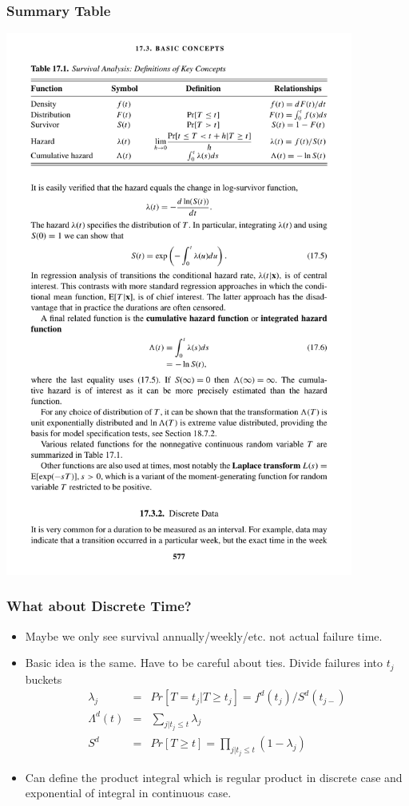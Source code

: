 \documentclass[aspectratio=169]{beamer}
\begin{document}
\begin{frame}
\frametitle{Summary Table}
\begin{center}
\includegraphics[width=4.5in]{./resources/parametrictable1.pdf}
\end{center}
\end{frame}

\begin{frame}
\frametitle{What about Discrete Time?}
\begin{itemize}
\item Maybe we only see survival annually/weekly/etc. not actual failure time.
\item Basic idea is the same. Have to be careful about ties. Divide failures into $t_j$ buckets
\begin{eqnarray*}
\lambda_j &=& Pr[T = t_j | T \geq t_j] = f^d(t_j) / S^d(t_{j-})\\
\Lambda^d(t)&=&\sum_{j | t_j \leq t} \lambda_j \\
S^d &=& Pr [T \geq t ] = \prod_{j| t_j \leq t} (1-\lambda_j)
\end{eqnarray*}
\item Can define the \alert{product integral} which is regular product in discrete case and exponential of integral in continuous case.
\end{itemize}
\end{frame}
\end{document}
